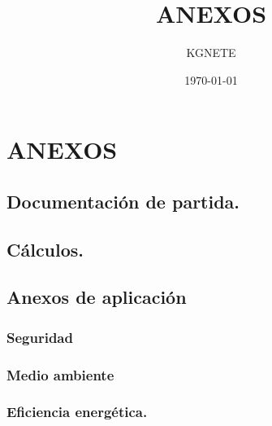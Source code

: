 \documentclass{article}
\title{ANEXOS}
\author{KGNETE}
\date{\today}
\begin{document}
\maketitle
\chapter{ANEXOS}
\section{Documentación de partida.}

\section{Cálculos.}
% 

\newpage

\newpage

\newpage

\newpage

\newpage



\section{Anexos de aplicación}
\subsection{Seguridad}
\subsection{Medio ambiente}
\subsection{Eficiencia energética.}
\end{document}

